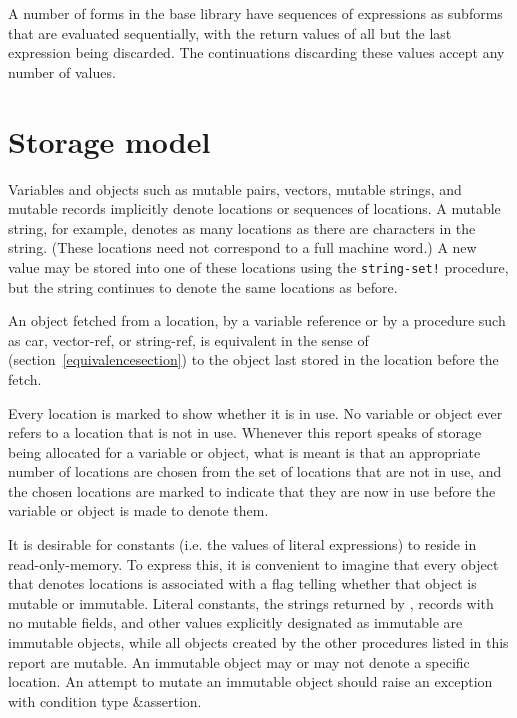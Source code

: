 A number of forms in the base library have sequences of expressions
as subforms that are evaluated sequentially, with the return values of
all but the last expression being discarded.  The continuations
discarding these values accept any number of values.

\section{Storage model}
\label{storagemodel}

Variables and objects such as mutable pairs, vectors, mutable strings,
and mutable records implicitly
denote locations or sequences of locations.  A
mutable string, for example, denotes as many locations as there are characters in the string. 
(These locations need not correspond to a full machine word.) A new value may be
stored into one of these locations using the {\tt string-set!} procedure, but
the string continues to denote the same locations as before.

An object fetched from a location, by a variable reference or by
a procedure such as {\cf car}, {\cf vector-ref}, or {\cf string-ref}, is
equivalent in the sense of  %
(section~\ref{equivalencesection})
to the object last stored in the location before the fetch.

Every location is marked to show whether it is in use.
No variable or object ever refers to a location that is not in use.
Whenever this report speaks of storage being allocated for a variable
or object, what is meant is that an appropriate number of locations are
chosen from the set of locations that are not in use, and the chosen
locations are marked to indicate that they are now in use before the variable
or object is made to denote them.

It is desirable for constants (i.e. the values of
literal expressions) to reside in read-only-memory.  To express this,
it is convenient to imagine that every object that denotes locations
is associated with a flag telling whether that object is
mutable or immutable.  Literal
constants, the strings returned by , records with
no mutable fields, and other values explicitly designated as immutable
are immutable objects, while all objects created by the other
procedures listed in this report are mutable.  
An immutable object may or may not denote a specific location.
An attempt to mutate an immutable object
should raise an exception with condition type {\cf\&assertion}.

